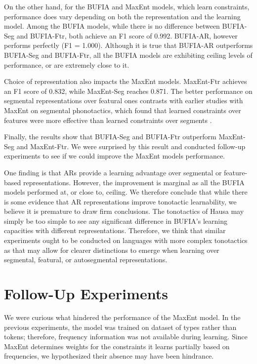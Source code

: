 % 

On the other hand, for the BUFIA and MaxEnt models, which learn constraints,
performance does vary depending on both the representation and the learning
model.
Among the BUFIA models, while there is no difference between BUFIA-Seg and
BUFIA-Ftr,
both achieve an F1 score of 0.992. BUFIA-AR, however performs perfectly (F1 =
1.000).
Although it is true that BUFIA-AR outperforms BUFIA-Seg and BUFIA-Ftr,
all the BUFIA models are exhibiting ceiling levels of performance,
or are extremely close to it.

Choice of representation also impacts the MaxEnt models.
MaxEnt-Ftr achieves an F1 score of 0.832, while MaxEnt-Seg reaches
0.871. The better performance on segmental representations over featural ones
contrasts with earlier studies with MaxEnt on segmental phonotactics, which
found that learned constraints over features were more effective
than learned constraints over segments \citep{hayes2008maximum,
  wilson2018accidental}.

Finally, the results show that BUFIA-Seg and BUFIA-Ftr outperform
MaxEnt-Seg and MaxEnt-Ftr. We were surprised by this result and
conducted follow-up experiments to see if we could improve the
MaxEnt models performance.


One finding is that ARs provide a learning advantage over segmental or
feature-based representations.
However, the improvement is marginal as all the BUFIA models performed at,
or close to, ceiling.
We therefore conclude that while there is some evidence that
AR representations improve tonotactic learnability,
we believe it is premature to draw firm conclusions.
The tonotactics of Hausa may simply be too simple to see
any significant difference in BUFIA's learning capacities with different representations.
Therefore, we think that similar experiments ought to be conducted
on languages with more complex tonotactics as that may allow for
clearer distinctions to emerge when learning over
segmental, featural, or autosegmental representations.


\section{Follow-Up Experiments}


We were curious what hindered the performance of the MaxEnt model.
In the previous experiments,
the model was trained on dataset of types rather than tokens; therefore,
frequency information was not available during learning.
Since MaxEnt determines weights for the constraints it learns
partially based on frequencies,
we hypothesized their absence may have been hindrance.


